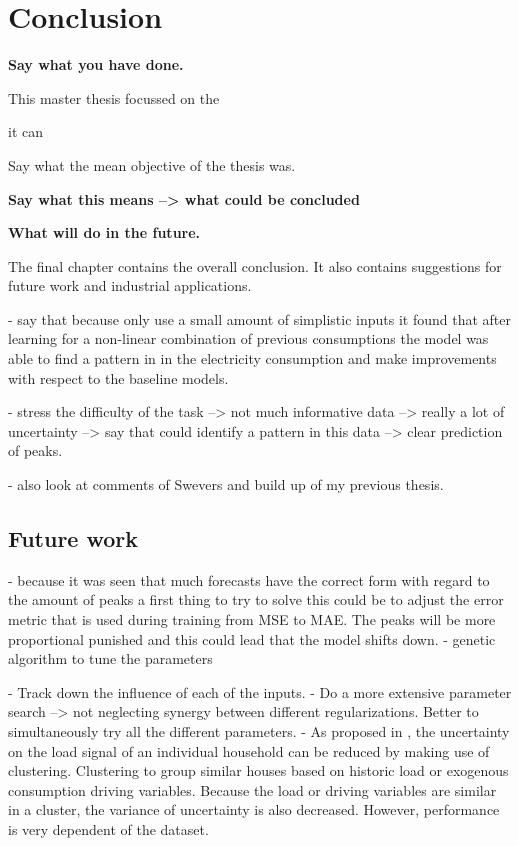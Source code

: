 \chapter{Conclusion}
\label{cha:conclusion}
\textbf{Say what you have done.}

This master thesis focussed on the 

it can 


Say what the mean objective of the thesis was. 


\textbf{Say what this means --> what could be concluded}




\textbf{What will do in the future.}


The final chapter contains the overall conclusion. It also contains
suggestions for future work and industrial applications.

- say that because only use a small amount of simplistic inputs it found that after learning for a non-linear combination of previous consumptions the model was able to find a pattern in in the electricity consumption and make improvements with respect to the baseline models.

- stress the difficulty of the task --> not much informative data --> really a lot of uncertainty --> say that could identify a pattern in this data --> clear prediction of peaks.

- also look at comments of Swevers and build up of my previous thesis.

\section{Future work}
- because it was seen that much forecasts have the correct form with regard to the amount of peaks a first thing to try to solve this could be to adjust the error metric that is used during training from MSE to MAE. The peaks will be more proportional punished and this could lead that the model shifts down. 
- genetic algorithm to tune the parameters

- Track down the influence of each of the inputs.
- Do a more extensive parameter search --> not neglecting synergy between different regularizations. Better to simultaneously try all the different parameters.
- As proposed in \cite{Shi2018}, the uncertainty on the load signal of an individual household can be reduced by making use of clustering.  Clustering to group similar houses based on historic load or exogenous consumption driving variables. Because the load or driving variables are similar in a cluster, the variance of uncertainty is also decreased. However, performance is very dependent of the dataset.

